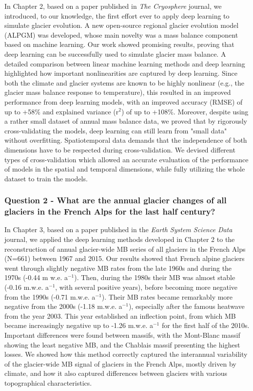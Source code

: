 In Chapter 2, based on a paper published in \textit{The Cryosphere} journal, we introduced, to our knowledge, the first effort ever to apply deep learning to simulate glacier evolution. A new open-source regional glacier evolution model (ALPGM) was developed, whose main novelty was a mass balance component based on machine learning. Our work showed promising results, proving that deep learning can be successfully used to simulate glacier mass balance. A detailed comparison between linear machine learning methods and deep learning highlighted how important nonlinearities are captured by deep learning. Since both the climate and glacier systems are known to be highly nonlinear (e.g., the glacier mass balance response to temperature), this resulted in an improved performance from deep learning models, with an improved accuracy (RMSE) of up to +58\% and explained variance (r$ ^{2}$) of up to +108\%. Moreover, despite using a rather small dataset of annual mass balance data, we proved that by rigorously cross-validating the models, deep learning can still learn from "small data" without overfitting. Spatiotemporal data demands that the independence of both dimensions have to be respected during cross-validation. We devised different types of cross-validation which allowed an accurate evaluation of the performance of models in the spatial and temporal dimensions, while fully utilizing the whole dataset to train the models. 

\subsubsection{Question 2 - What are the annual glacier changes of all glaciers in the French Alps for the last half century?}

In Chapter 3, based on a paper published in the \textit{Earth System Science Data} journal, we applied the deep learning methods developed in Chapter 2 to the reconstruction of annual glacier-wide MB series of all glaciers in the French Alps (N=661) between 1967 and 2015. Our results showed that French alpine glaciers went through slightly negative MB rates from the late 1960s and during the 1970s (-0.44 m w.e. a$^{-1}$). Then, during the 1980s  their MB was almost stable (-0.16 m.w.e. a$^{-1}$, with several positive years), before becoming more negative from the 1990s (-0.71 m.w.e. a$^{-1}$). Their MB rates became remarkably more negative from the 2000s (-1.18 m.w.e. a$^{-1}$), especially after the famous heatwave from the year 2003. This year established an inflection point, from which MB became increasingly negative up to -1.26 m.w.e. a$^{-1}$ for the first half of the 2010s. Important differences were found between massifs, with the Mont-Blanc massif showing the least negative MB, and the Chablais massif presenting the highest losses. We showed how this method correctly captured the interannual variability of the glacier-wide MB signal of glaciers in the French Alps, mostly driven by climate, and how it also captured differences between glaciers with various topographical characteristics. 


